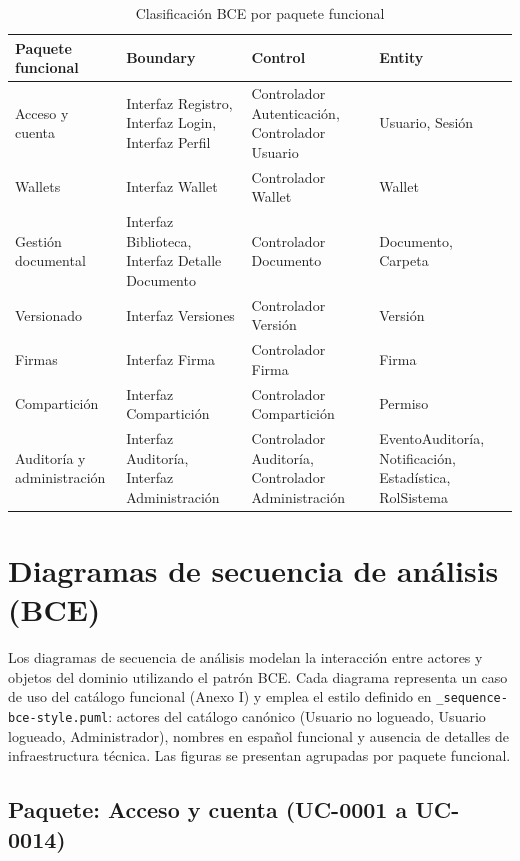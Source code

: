 \documentclass[11pt, a4paper]{article}
\begin{document}
\begin{table}[H]
\centering
\small
\renewcommand{\arraystretch}{1.3}
\begin{tabular}{|l|l|l|l|}
\hline
\textbf{Paquete funcional} & \textbf{Boundary} & \textbf{Control} & \textbf{Entity} \\
\hline
Acceso y cuenta & Interfaz Registro, Interfaz Login, Interfaz Perfil & Controlador Autenticación, Controlador Usuario & Usuario, Sesión \\
\hline
Wallets & Interfaz Wallet & Controlador Wallet & Wallet \\
\hline
Gestión documental & Interfaz Biblioteca, Interfaz Detalle Documento & Controlador Documento & Documento, Carpeta \\
\hline
Versionado & Interfaz Versiones & Controlador Versión & Versión \\
\hline
Firmas & Interfaz Firma & Controlador Firma & Firma \\
\hline
Compartición & Interfaz Compartición & Controlador Compartición & Permiso \\
\hline
Auditoría y administración & Interfaz Auditoría, Interfaz Administración & Controlador Auditoría, Controlador Administración & EventoAuditoría, Notificación, Estadística, RolSistema \\
\hline
\end{tabular}
\caption{Clasificación BCE por paquete funcional}
\label{tab:bce-clasificacion}
\end{table}


\section{Diagramas de secuencia de análisis (BCE)}

Los diagramas de secuencia de análisis modelan la interacción entre actores y objetos del dominio utilizando el patrón BCE. Cada diagrama representa un caso de uso del catálogo funcional (Anexo I) y emplea el estilo definido en \texttt{\_sequence-bce-style.puml}: actores del catálogo canónico (Usuario no logueado, Usuario logueado, Administrador), nombres en español funcional y ausencia de detalles de infraestructura técnica. Las figuras se presentan agrupadas por paquete funcional.

\subsection{Paquete: Acceso y cuenta (UC-0001 a UC-0014)}
\end{document}
